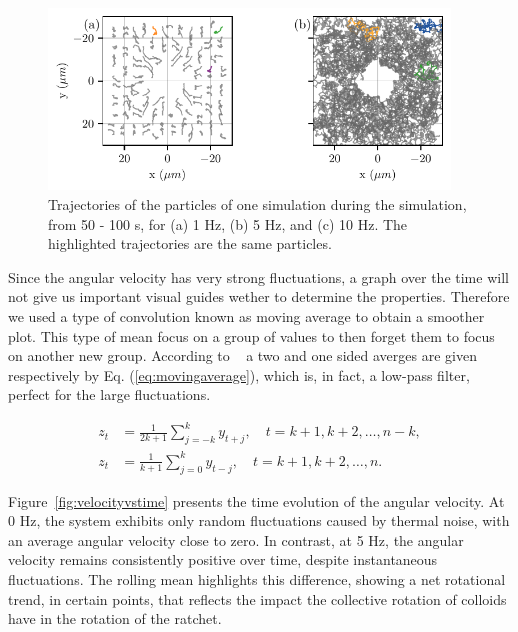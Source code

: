 \begin{figure}[h]
\begin{center}
\includegraphics[width=0.95\textwidth]{figures/parttrj.pdf}
\end{center}
\caption[Particle trajectories at different driving frequencies.]
{Trajectories of the particles of one simulation during the simulation, from 50 - 100 s, for (a) 1 Hz, (b) 5 Hz, and (c) 10 Hz. The highlighted trajectories are the same particles.}
\label{fig:particletrj}
\end{figure}

Since the angular velocity has very strong fluctuations, a graph over the time will not give us important visual guides wether to determine the properties. Therefore we used a type of convolution known as moving average to obtain a smoother plot. This type of mean focus on a group of values to then forget them to focus on another new group. According to ~\cite{hyndman2025moving} a two and one sided averges are given respectively by Eq. (\ref{eq:movingaverage}), which is, in fact, a low-pass filter, perfect for the large fluctuations.

\begin{align}
  z_t &= \frac{1}{2k+1} \sum^{k}_{j =-k} y_{t+j}, \quad t=k+1, k+2,\dots,n-k,\\
  z_t &= \frac{1}{k+1} \sum^{k}_{j =0} y_{t-j}, \quad t=k+1, k+2,\dots,n.
  \label{eq:movingaverage}
\end{align}

Figure~\ref{fig:velocityvstime} presents the time evolution of the angular velocity. At 0 Hz, the system exhibits only random fluctuations caused by thermal noise, with an average angular velocity close to zero. In contrast, at 5 Hz, the angular velocity remains consistently positive over time, despite instantaneous fluctuations. The rolling mean highlights this difference, showing a net rotational trend, in certain points, that reflects the impact the collective rotation of colloids have in the rotation of the ratchet.

